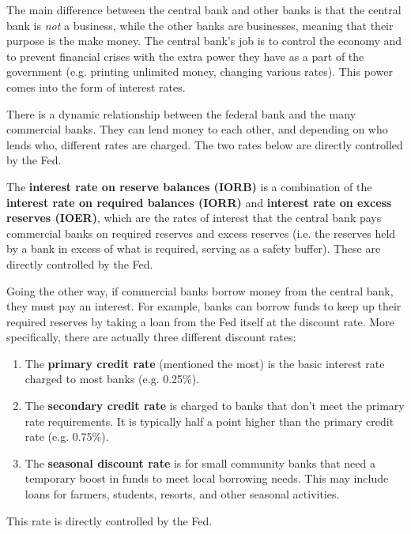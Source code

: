\documentclass{article}
\begin{document}
    The main difference between the central bank and other banks is that the central bank is \textit{not} a business, while the other banks are businesses, meaning that their purpose is the make money. The central bank's job is to control the economy and to prevent financial crises with the extra power they have as a part of the government (e.g. printing unlimited money, changing various rates). This power comes into the form of interest rates. 

    There is a dynamic relationship between the federal bank and the many commercial banks. They can lend money to each other, and depending on who lends who, different rates are charged. The two rates below are directly controlled by the Fed.

    \begin{definition}
      The \textbf{interest rate on reserve balances (IORB)} is a combination of the \textbf{interest rate on required balances (IORR)} and \textbf{interest rate on excess reserves (IOER)}, which are the rates of interest that the central bank pays commercial banks on required reserves and excess reserves (i.e. the reserves held by a bank in excess of what is required, serving as a safety buffer). These are directly controlled by the Fed.
    \end{definition}

    \begin{definition}
      Going the other way, if commercial banks borrow money from the central bank, they must pay an interest. For example, banks can borrow funds to keep up their required reserves by taking a loan from the Fed itself at the discount rate. More specifically, there are actually three different discount rates: 
      \begin{enumerate}
        \item The \textbf{primary credit rate} (mentioned the most) is the basic interest rate charged to most banks (e.g. 0.25\%). 
        \item The \textbf{secondary credit rate} is charged to banks that don't meet the primary rate requirements. It is typically half a point higher than the primary credit rate (e.g. 0.75\%). 
        \item The \textbf{seasonal discount rate} is for small community banks that need a temporary boost in funds to meet local borrowing needs. This may include loans for farmers, students, resorts, and other seasonal activities. 
      \end{enumerate}
      This rate is directly controlled by the Fed. 
    \end{definition}
\end{document}
